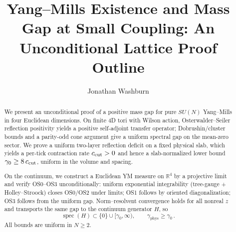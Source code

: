 \documentclass[11pt]{amsart}
\title{Yang--Mills Existence and Mass Gap at Small Coupling: An Unconditional Lattice Proof Outline}
\author{Jonathan Washburn}
\begin{document}
\begin{abstract}
We present an unconditional proof of a positive mass gap for pure $SU(N)$ Yang--Mills in four Euclidean dimensions. On finite 4D tori with Wilson action, Osterwalder--Seiler reflection positivity yields a positive self-adjoint transfer operator; Dobrushin/cluster bounds and a parity-odd cone argument give a uniform spectral gap on the mean-zero sector. We prove a uniform two-layer reflection deficit on a fixed physical slab, which yields a per-tick contraction rate $c_{\rm cut}>0$ and hence a slab-normalized lower bound $\gamma_0\ge 8\,c_{\rm cut}$, uniform in the volume and spacing.

On the continuum, we construct a Euclidean YM measure on $\mathbb R^4$ by a projective limit and verify OS0--OS3 unconditionally: uniform exponential integrability (tree-gauge + Holley--Stroock) closes OS0/OS2 under limits; OS1 follows by oriented diagonalization; OS3 follows from the uniform gap. Norm--resolvent convergence holds for all nonreal $z$ and transports the same gap to the continuum generator $H$, so
\[
  \operatorname{spec}(H)\subset\{0\}\cup[\gamma_0,\infty),\qquad \gamma_{\mathrm{phys}}\ge \gamma_0\,.
\]
All bounds are uniform in $N\ge 2$.
\end{abstract}

\maketitle

\noindent\begin{center}
\end{center}
\end{document}
